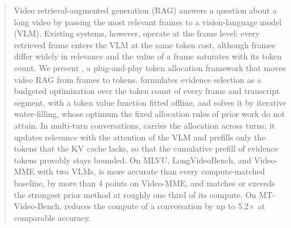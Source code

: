 \begin{abstract}
Video retrieval-augmented generation (RAG) answers a question about a long video by passing the most relevant frames
to a vision-language model (VLM). Existing systems, however, operate at the frame level: every retrieved frame enters
the VLM at the same token cost, although frames differ widely in relevance and the value of a frame saturates with its
token count. We present \name, a plug-and-play token allocation framework that moves video RAG from frames to tokens.
\name formulates evidence selection as a budgeted optimization over the token count of every frame and transcript
segment, with a token value function fitted offline, and solves it by iterative water-filling, whose optimum the
fixed allocation rules of prior work do not attain. In multi-turn conversations, \name carries the allocation
across turns: it updates relevance with the attention of the VLM and prefills only the tokens that the KV cache lacks,
so that the cumulative prefill of evidence tokens provably stays bounded. On MLVU, LongVideoBench, and Video-MME with
two VLMs, \name is more accurate than every compute-matched baseline, by more than 4 points on Video-MME, and
matches or exceeds the strongest prior method at roughly one third of its compute. On MT-Video-Bench,
\name reduces the compute of a conversation by up to 5.2$\times$ at comparable accuracy.
\end{abstract}
